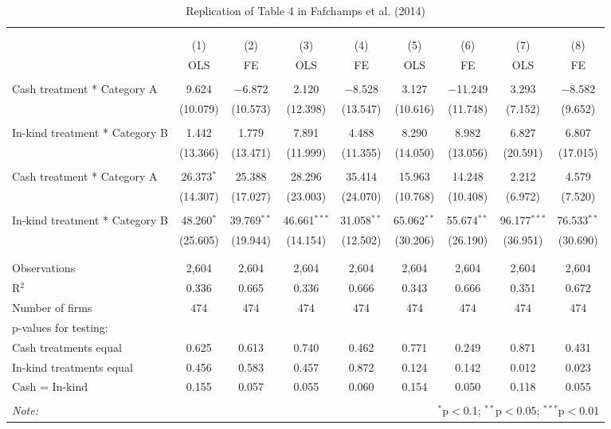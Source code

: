 
\begin{table}[!htbp] \centering 
  \caption{Replication of Table 4 in Fafchamps et al. (2014)} 
  \label{} 
\begin{tabular}{@{\extracolsep{5pt}}lcccccccc} 
\\[-1.8ex]\hline 
\hline \\[-1.8ex] 
\\[-1.8ex] & (1) & (2) & (3) & (4) & (5) & (6) & (7) & (8)\\ 
 & OLS & FE & OLS & FE & OLS & FE & OLS & FE \\ 
\hline \\[-1.8ex] 
 Cash treatment * Category A & 9.624 & $-$6.872 & 2.120 & $-$8.528 & 3.127 & $-$11.249 & 3.293 & $-$8.582 \\ 
  & (10.079) & (10.573) & (12.398) & (13.547) & (10.616) & (11.748) & (7.152) & (9.652) \\ 
  & & & & & & & & \\ 
 In-kind treatment * Category B & 1.442 & 1.779 & 7.891 & 4.488 & 8.290 & 8.982 & 6.827 & 6.807 \\ 
  & (13.366) & (13.471) & (11.999) & (11.355) & (14.050) & (13.056) & (20.591) & (17.015) \\ 
  & & & & & & & & \\ 
 Cash treatment * Category A & 26.373$^{*}$ & 25.388 & 28.296 & 35.414 & 15.963 & 14.248 & 2.212 & 4.579 \\ 
  & (14.307) & (17.027) & (23.003) & (24.070) & (10.768) & (10.408) & (6.972) & (7.520) \\ 
  & & & & & & & & \\ 
 In-kind treatment * Category B & 48.260$^{*}$ & 39.769$^{**}$ & 46.661$^{***}$ & 31.058$^{**}$ & 65.062$^{**}$ & 55.674$^{**}$ & 96.177$^{***}$ & 76.533$^{**}$ \\ 
  & (25.605) & (19.944) & (14.154) & (12.502) & (30.206) & (26.190) & (36.951) & (30.690) \\ 
  & & & & & & & & \\ 
\hline \\[-1.8ex] 
Observations & 2,604 & 2,604 & 2,604 & 2,604 & 2,604 & 2,604 & 2,604 & 2,604 \\ 
R$^{2}$ & 0.336 & 0.665 & 0.336 & 0.666 & 0.343 & 0.666 & 0.351 & 0.672 \\ 
Number of firms & 474 & 474 & 474 & 474 & 474 & 474 & 474 & 474 \\ 
p-values for testing: &  &  &  &  &  &  &  &  \\ 
Cash treatments equal & 0.625 & 0.613 & 0.740 & 0.462 & 0.771 & 0.249 & 0.871 & 0.431 \\ 
In-kind treatments equal & 0.456 & 0.583 & 0.457 & 0.872 & 0.124 & 0.142 & 0.012 & 0.023 \\ 
Cash = In-kind & 0.155 & 0.057 & 0.055 & 0.060 & 0.154 & 0.050 & 0.118 & 0.055 \\ 
\hline \\[-1.8ex] 
\textit{Note:}  & \multicolumn{8}{r}{$^{*}$p$<$0.1; $^{**}$p$<$0.05; $^{***}$p$<$0.01} \\ 
\end{tabular} 
\end{table} 
